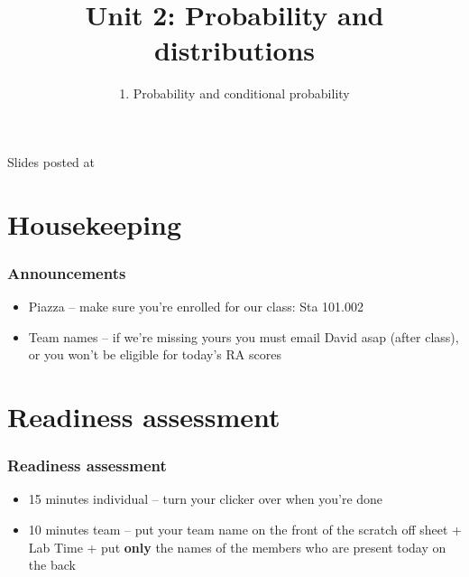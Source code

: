 \documentclass[11pt,containsverbatim,handout,xcolor=xelatex,dvipsnames,table]{beamer}
\title{Unit 2: Probability and distributions}
\subtitle{1. Probability and conditional probability}
\author{\CourseName}
\date{}
\institute{\InstituteName}
\begin{document}



\begin{frame}[plain]

\titlepage

\vfill

{\scriptsize {} \hfill Slides posted at  \webURL{\CourseSite}}

\addtocounter{framenumber}{-1} 

\end{frame}


\section{Housekeeping}


\begin{frame}
\frametitle{Announcements}

\begin{itemize}

\item Piazza -- make sure you're enrolled for our class: Sta 101.002

\item Team names -- if we're missing yours you must email David asap 
(after class), or you won't be eligible for today's RA scores

\end{itemize}

\end{frame}


\section{Readiness assessment}


\begin{frame}
\frametitle{Readiness assessment}

\begin{itemize}

\item 15 minutes individual -- turn your clicker over when you're done

\item 10 minutes team -- put your team name on the front of the scratch 
off sheet + Lab Time + put \textbf{only} the names of the members who are 
present today on the back

\end{itemize}

\end{frame}
\end{document}
